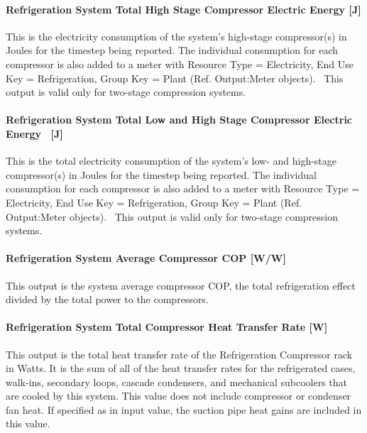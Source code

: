 \paragraph{Refrigeration System Total High Stage Compressor Electric Energy {[}J{]}}\label{refrigeration-system-total-high-stage-compressor-electric-energy-j}

This is the electricity consumption of the system's high-stage compressor(s) in Joules for the timestep being reported. The individual consumption for each compressor is also added to a meter with Resource Type = Electricity, End Use Key = Refrigeration, Group Key = Plant (Ref. Output:Meter objects).~ This output is valid only for two-stage compression systems.

\paragraph{Refrigeration System Total Low and High Stage Compressor Electric Energy~ {[}J{]}}\label{refrigeration-system-total-low-and-high-stage-compressor-electric-energy-j}

This is the total electricity consumption of the system's low- and high-stage compressor(s) in Joules for the timestep being reported. The individual consumption for each compressor is also added to a meter with Resource Type = Electricity, End Use Key = Refrigeration, Group Key = Plant (Ref. Output:Meter objects).~ This output is valid only for two-stage compression systems.

\paragraph{Refrigeration System Average Compressor COP {[}W/W{]}}\label{refrigeration-system-average-compressor-cop-ww}

This output is the system average compressor COP, the total refrigeration effect divided by the total power to the compressors.

\paragraph{Refrigeration System Total Compressor Heat Transfer Rate {[}W{]}}\label{refrigeration-system-total-compressor-heat-transfer-rate-w}

This output is the total heat transfer rate of the Refrigeration Compressor rack in Watts. It is the sum of all of the heat transfer rates for the refrigerated cases, walk-ins, secondary loops, cascade condensers, and mechanical subcoolers that are cooled by this system. This value does not include compressor or condenser fan heat. If specified as in input value, the suction pipe heat gains are included in this value.

